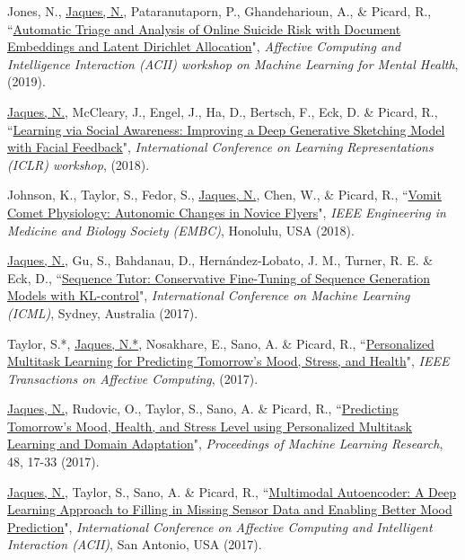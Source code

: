 \documentclass[paper=letter,fontsize=11pt]{scrartcl} %
\newcommand{\PaperEntry}[6]{
        \noindent #1, ``\href{#6}{#2}", \textit{#3}, #4 (#5).}
\begin{document}
\begin{etaremune}
\item \PaperEntry{Jones, N., \underline{Jaques, N.}, Pataranutaporn, P., Ghandeharioun, A., \& Picard, R.}{Automatic Triage and Analysis of Online Suicide Risk with Document Embeddings and Latent Dirichlet Allocation}{Affective Computing and Intelligence Interaction (ACII) workshop on Machine Learning for Mental Health}{}{2019}{https://drive.google.com/file/d/1muoFj_BXJUZCRyjCLEX9DxKOz7b9nKtj/view?usp=sharing}

\item \PaperEntry{\underline{Jaques, N.}, McCleary, J., Engel, J., Ha, D., Bertsch, F.,  Eck, D. \& Picard, R.}{Learning via Social Awareness: Improving a Deep Generative Sketching Model with Facial Feedback}{International Conference on Learning Representations (ICLR) workshop}{}{2018}{https://arxiv.org/pdf/1802.04877.pdf}

\item \PaperEntry{Johnson, K., Taylor, S., Fedor, S., \underline{Jaques, N.}, Chen, W., \& Picard, R.}{Vomit Comet Physiology: Autonomic Changes in Novice Flyers}{IEEE Engineering in Medicine and Biology Society (EMBC)}{Honolulu, USA}{2018}{https://dspace.mit.edu/bitstream/handle/1721.1/123805/18.Johnson-etal_EMBC18_VomitComet.pdf?sequence=1&isAllowed=y}

\item \PaperEntry{\underline{Jaques, N.}, Gu, S., Bahdanau, D., Hern\'{a}ndez-Lobato, J. M., Turner, R. E. \& Eck, D.}{Sequence Tutor: Conservative Fine-Tuning of Sequence Generation Models with KL-control}{International Conference on Machine Learning (ICML)}{Sydney, Australia}{2017}{https://arxiv.org/pdf/1611.02796.pdf}

\item \PaperEntry{Taylor, S.*, \underline{Jaques, N.*}, Nosakhare, E., Sano, A. \& Picard, R.}{Personalized Multitask Learning for Predicting Tomorrow's Mood, Stress, and Health}{IEEE Transactions on Affective Computing}{}{2017}{https://affect.media.mit.edu/pdfs/17.TaylorJaques-PredictingTomorrowsMoods.pdf}

\item \PaperEntry{\underline{Jaques, N.}, Rudovic, O., Taylor, S., Sano, A. \& Picard, R.}{Predicting Tomorrow’s Mood, Health, and Stress Level using Personalized Multitask Learning and Domain Adaptation}{Proceedings of Machine Learning Research}{48, 17-33}{2017}{http://proceedings.mlr.press/v66/jaques17a/jaques17a.pdf}

\item \PaperEntry{\underline{Jaques, N.}, Taylor, S., Sano, A. \& Picard, R.}{Multimodal Autoencoder: A Deep Learning Approach to Filling in Missing Sensor Data and Enabling Better Mood Prediction}{International Conference on Affective Computing and Intelligent Interaction (ACII)}{San Antonio, USA}{2017}{https://affect.media.mit.edu/pdfs/17.Jaques_autoencoder_ACII.pdf}


\end{etaremune}
\end{document}
